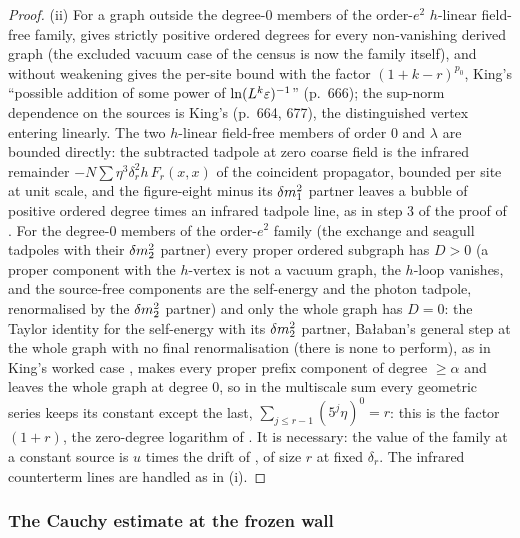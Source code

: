 \begin{proof}
(ii) For a graph outside the degree-$0$ members of the order-$e^2$ $h$-linear field-free family,  gives strictly positive ordered degrees for every non-vanishing derived graph (the excluded vacuum case of the census is now the family itself), and  without weakening gives the per-site bound with the factor $(1+k-r)^{p_0}$, King's ``possible addition of some power of $\ln(L^k\varepsilon)^{-1}$'' (p.~666); the sup-norm dependence on the sources is King's (p.~664, 677), the distinguished vertex entering linearly. The two $h$-linear field-free members of order $0$ and $\lambda$ are bounded directly: the subtracted tadpole at zero coarse field is the infrared remainder $-N\sum\eta^3\delta_r^2h\,F_{r}(x,x)$ of the coincident propagator, bounded per site at unit scale, and the figure-eight minus its $\delta m^2_1$ partner leaves a bubble of positive ordered degree times an infrared tadpole line, as in step 3 of the proof of . For the degree-$0$ members of the order-$e^2$ family (the exchange and seagull tadpoles with their $\delta m^2_2$ partner) every proper ordered subgraph has $D>0$ (a proper component with the $h$-vertex is not a vacuum graph, the $h$-loop vanishes, and the source-free components are the self-energy and the photon tadpole, renormalised by the $\delta m^2_2$ partner) and only the whole graph has $D=0$: the Taylor identity for the self-energy with its $\delta m^2_2$ partner, Ba{\l}aban's general step at the whole graph with no final renormalisation (there is none to perform), as in King's worked case \cite[(3.81)--(3.87)]{K1}, makes every proper prefix component of degree $\ge\alpha$ and leaves the whole graph at degree $0$, so in the multiscale sum every geometric series keeps its constant except the last, $\sum_{j\le r-1}(5^j\eta)^0=r$: this is the factor $(1+r)$, the zero-degree logarithm of . It is necessary: the value of the family at a constant source is $u$ times the drift of , of size $r$ at fixed $\delta_r$. The infrared counterterm lines are handled as in (i).
\end{proof}

\subsubsection*{The Cauchy estimate at the frozen wall}

